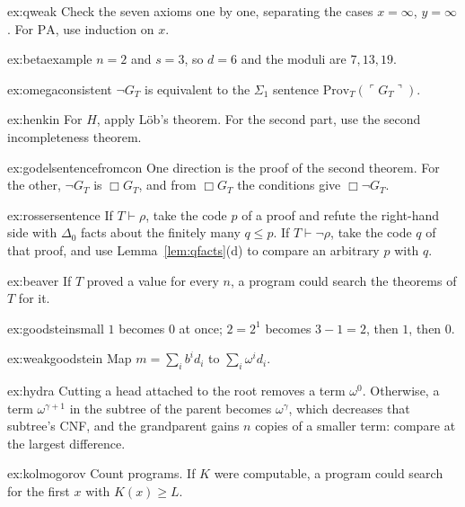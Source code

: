 \begin{hint}{ex:qweak}
Check the seven axioms one by one, separating the cases $x=\infty$, $y=\infty$. For $\mathrm{PA}$, use induction on $x$.
\end{hint}
\begin{hint}{ex:betaexample}
$n=2$ and $s=3$, so $d=6$ and the moduli are $7,13,19$.
\end{hint}
\begin{hint}{ex:omegaconsistent}
$\neg G_T$ is equivalent to the $\Sigma_1$ sentence $\mathrm{Prov}_T(\ulcorner G_T\urcorner)$.
\end{hint}
\begin{hint}{ex:henkin}
For $H$, apply Löb's theorem. For the second part, use the second incompleteness theorem.
\end{hint}
\begin{hint}{ex:godelsentencefromcon}
One direction is the proof of the second theorem. For the other, $\neg G_T$ is $\Box G_T$, and from $\Box G_T$ the conditions give $\Box\neg G_T$.
\end{hint}
\begin{hint}{ex:rossersentence}
If $T\vdash\rho$, take the code $p$ of a proof and refute the right-hand side with $\Delta_0$ facts about the finitely many $q\le p$. If $T\vdash\neg\rho$, take the code $q$ of that proof, and use Lemma~\ref{lem:qfacts}(d) to compare an arbitrary $p$ with $q$.
\end{hint}
\begin{hint}{ex:beaver}
If $T$ proved a value for every $n$, a program could search the theorems of $T$ for it.
\end{hint}
\begin{hint}{ex:goodsteinsmall}
$1$ becomes $0$ at once; $2=2^1$ becomes $3-1=2$, then $1$, then $0$.
\end{hint}
\begin{hint}{ex:weakgoodstein}
Map $m=\sum_ib^id_i$ to $\sum_i\omega^id_i$.
\end{hint}
\begin{hint}{ex:hydra}
Cutting a head attached to the root removes a term $\omega^0$. Otherwise, a term $\omega^{\gamma+1}$ in the subtree of the parent becomes $\omega^{\gamma}$, which decreases that subtree's CNF, and the grandparent gains $n$ copies of a smaller term: compare at the largest difference.
\end{hint}
\begin{hint}{ex:kolmogorov}
Count programs. If $K$ were computable, a program could search for the first $x$ with $K(x)\ge L$.
\end{hint}

